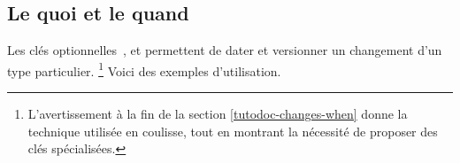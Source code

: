\documentclass[10pt, a4paper]{../main/main}
\begin{document}
\subsection{Le quoi et le quand}

Les clés optionnelles \,,  et  permettent de dater et versionner un changement d'un type particulier.%
\footnote{
    L'avertissement à la fin de la section \ref{tutodoc-changes-when} donne la technique utilisée en coulisse, tout en montrant la nécessité de proposer des clés spécialisées.
}
Voici des exemples d'utilisation.

\end{document}
